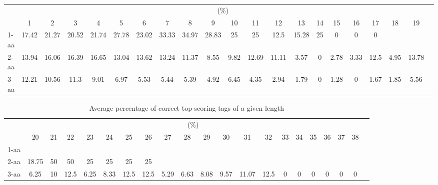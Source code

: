 \documentclass{article}
\begin{document}
\begin{table}[h]\tiny
\vspace{3mm}
{\centering
\begin{center}
\begin{tabular}{|l|c|c|c|c|c|c|c|c|c|c|c|c|c|c|c|c|c|c|c|c|}
  \hline
  & \multicolumn{ 19 }{|c|}{(\%)} \\
  \cline{2- 20}
    & 1 & 2 & 3 & 4 & 5 & 6 & 7 & 8 & 9 & 10 & 11 & 12 & 13 & 14 & 15 & 16 & 17 & 18 & 19\\
  \hline
1-aa  & 17.42 & 21.27 & 20.52 & 21.74 & 27.78 & 23.02 & 33.33 & 34.97 & 28.83 & 25 & 25 & 12.5 & 15.28 & 25 & 0 & 0 & 0 &  & \\
2-aa  & 13.94 & 16.06 & 16.39 & 16.65 & 13.04 & 13.62 & 13.24 & 11.37 & 8.55 & 9.82 & 12.69 & 11.11 & 3.57 & 0 & 2.78 & 3.33 & 12.5 & 4.95 & 13.78\\
3-aa  & 12.21 & 10.56 & 11.3 & 9.01 & 6.97 & 5.53 & 5.44 & 5.39 & 4.92 & 6.45 & 4.35 & 2.94 & 1.79 & 0 & 1.28 & 0 & 1.67 & 1.85 & 5.56\\
 \hline
\end{tabular}
\end{center}
\par}
\centering

\vspace{3mm}
\label{table:table12}
\end{table}
\begin{table}[h]\tiny
\vspace{3mm}
{\centering
\begin{center}
\begin{tabular}{|l|c|c|c|c|c|c|c|c|c|c|c|c|c|c|c|c|c|c|c|c|}
  \hline
  & \multicolumn{ 19 }{|c|}{(\%)} \\
  \cline{2- 20}
    & 20 & 21 & 22 & 23 & 24 & 25 & 26 & 27 & 28 & 29 & 30 & 31 & 32 & 33 & 34 & 35 & 36 & 37 & 38\\
  \hline
1-aa  &  &  &  &  &  &  &  &  &  &  &  &  &  &  &  &  &  &  & \\
2-aa  & 18.75 & 50 & 50 & 25 & 25 & 25 & 25 &  &  &  &  &  &  &  &  &  &  &  & \\
3-aa  & 6.25 & 10 & 12.5 & 6.25 & 8.33 & 12.5 & 12.5 & 5.29 & 6.63 & 8.08 & 9.57 & 11.07 & 12.5 & 0 & 0 & 0 & 0 & 0 & 0\\
 \hline
\end{tabular}
\end{center}
\par}
\centering

\caption{ Average percentage of correct top-scoring tags  of a given length}

\vspace{3mm}
\label{table:table12}
\end{table}
\end{document}

